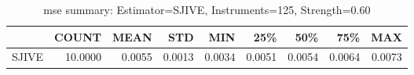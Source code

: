 \begin{table}[ht]
\centering
\caption{mse summary: Estimator=SJIVE, Instruments=125, Strength=0.60}
\begin{tabular}{lrrrrrrrr}
\toprule
 & COUNT & MEAN & STD & MIN & 25\% & 50\% & 75\% & MAX \\
\midrule
SJIVE & 10.0000 & 0.0055 & 0.0013 & 0.0034 & 0.0051 & 0.0054 & 0.0064 & 0.0073 \\
\bottomrule
\end{tabular}
\end{table}
